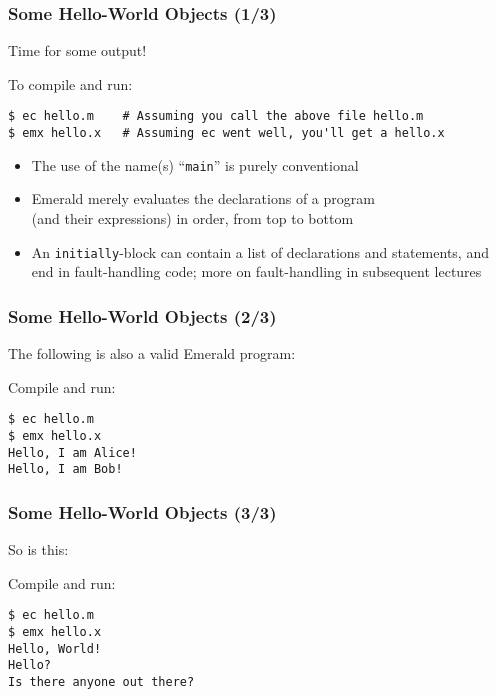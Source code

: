 \begin{frame}[fragile]

\frametitle{Some Hello-World Objects (1/3)}

Time for some output!



To compile and run:

\begin{lstlisting}
$ ec hello.m    # Assuming you call the above file hello.m
$ emx hello.x   # Assuming ec went well, you'll get a hello.x
\end{lstlisting}

\begin{itemize}

\item The use of the name(s) ``\texttt{main}'' is purely conventional

\item Emerald merely evaluates the declarations of a program\\ (and
their expressions) in order, from top to bottom

\item An \texttt{initially}-block can contain a list of declarations
and statements, and end in fault-handling code; more on fault-handling
in subsequent lectures

\end{itemize}

\end{frame}

\begin{frame}[fragile]

\frametitle{Some Hello-World Objects (2/3)}

The following is also a valid Emerald program:



Compile and run:

\begin{lstlisting}
$ ec hello.m
$ emx hello.x
Hello, I am Alice!
Hello, I am Bob!
\end{lstlisting}

\end{frame}

\begin{frame}[fragile]

\frametitle{Some Hello-World Objects (3/3)}

So is this:



Compile and run:

\begin{lstlisting}
$ ec hello.m
$ emx hello.x
Hello, World!
Hello?
Is there anyone out there?
\end{lstlisting}

\end{frame}
